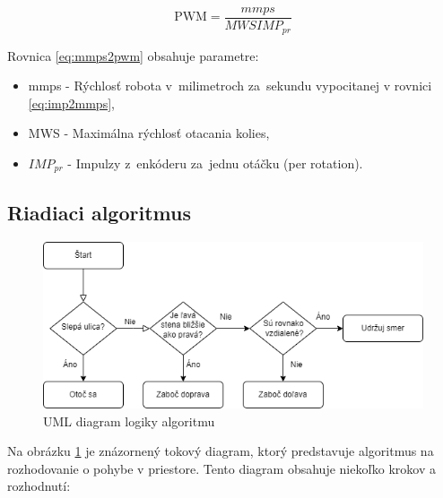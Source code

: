 \begin{equation}
	\text{PWM} = \frac{mmps}{MWS IMP_{pr}}
	\label{eq:mmps2pwm}
\end{equation}

Rovnica \ref{eq:mmps2pwm} obsahuje parametre:
\begin{itemize}
	\item mmps - Rýchlosť robota v~milimetroch za~sekundu vypocitanej v rovnici \ref{eq:imp2mmps},
	\item MWS - Maximálna rýchlosť otacania kolies,
	\item $IMP_{pr}$ - Impulzy z~enkóderu za~jednu otáčku (per rotation).
\end{itemize}


\newpage
\subsection{Riadiaci algoritmus}
\begin{figure}[!htpb]
    \centering
    \includegraphics[width=1\linewidth]{includes//images/uml_algo.png}
    \caption{UML diagram logiky algoritmu }
    \label{fig:uml_algo}
\end{figure}
Na obrázku \ref{fig:uml_algo} je znázornený tokový diagram, ktorý predstavuje algoritmus na rozhodovanie o pohybe v priestore. Tento diagram obsahuje niekoľko krokov a rozhodnutí:

